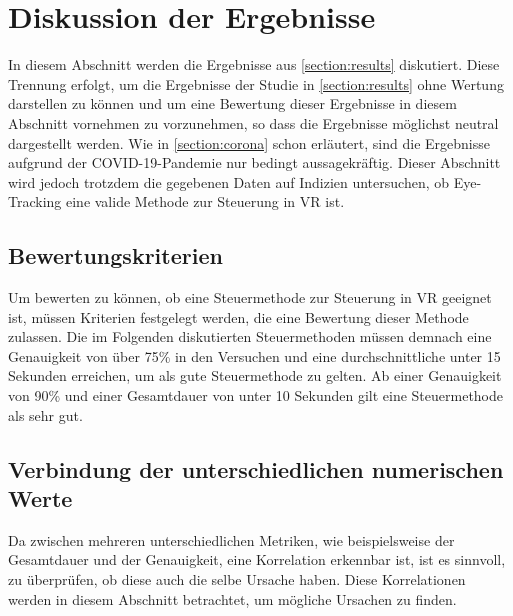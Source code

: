 
\chapter{Diskussion der Ergebnisse}
\label{section:discussion}
In diesem Abschnitt werden die Ergebnisse aus \autoref{section:results} diskutiert. Diese Trennung erfolgt, um die Ergebnisse der Studie in \autoref{section:results} ohne Wertung darstellen zu können und um eine Bewertung dieser Ergebnisse in diesem Abschnitt vornehmen zu vorzunehmen, so dass die Ergebnisse möglichst neutral dargestellt werden. Wie in \autoref{section:corona} schon erläutert, sind die Ergebnisse aufgrund der \ac{COVID-19}-Pandemie nur bedingt aussagekräftig. Dieser Abschnitt wird jedoch trotzdem die gegebenen Daten auf Indizien untersuchen, ob Eye-Tracking eine valide Methode zur Steuerung in \ac{VR} ist. 

\section{Bewertungskriterien}
\label{section:criteria}
Um bewerten zu können, ob eine Steuermethode zur Steuerung in \ac{VR} geeignet ist, müssen Kriterien festgelegt werden, die eine Bewertung dieser Methode zulassen. Die im Folgenden diskutierten Steuermethoden müssen demnach eine Genauigkeit von über 75\% in den Versuchen und eine durchschnittliche unter 15 Sekunden erreichen, um als gute Steuermethode zu gelten. Ab einer Genauigkeit von 90\% und einer Gesamtdauer von unter 10 Sekunden gilt eine Steuermethode als sehr gut. 

\section{Verbindung der unterschiedlichen numerischen Werte}
Da zwischen mehreren unterschiedlichen Metriken, wie beispielsweise der Gesamtdauer und der Genauigkeit, eine Korrelation erkennbar ist, ist es sinnvoll, zu überprüfen, ob diese auch die selbe Ursache haben. Diese Korrelationen werden in diesem Abschnitt betrachtet, um mögliche Ursachen zu finden.

